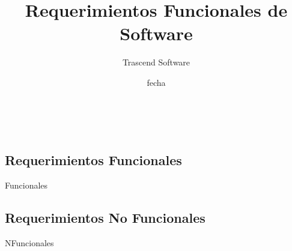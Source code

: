 \documentclass{article}
\title{Requerimientos Funcionales de Software}
\date
{
fecha
}
\author{
Trascend Software
}
\begin{document}


\maketitle %
\newpage %
\
\begin{center}
	\section*{Requerimientos Funcionales}
Funcionales
\end{center}

\newpage
\begin{center}
	\section*{Requerimientos No Funcionales}
NFuncionales
\end{center}
\end{document}
